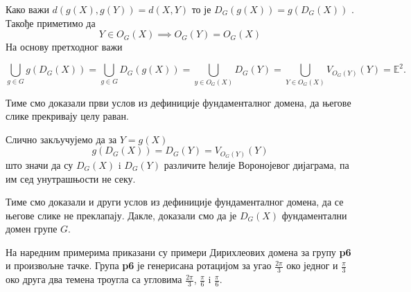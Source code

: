 \documentclass[12pt]{report}
\begin{document}
\noindent Како важи $d(g(X), g(Y))= d(X,Y)$ то је  $D_G(g(X)) = g(D_G(X))$  .
Такође приметимо да $$Y \in  O_G(X) \implies O_G(Y) = O_G(X) $$
На основу претходног важи

$$\bigcup_{g\in G}g(D_G(X)) = \bigcup_{g\in G}D_G(g(X)) = \bigcup_{y \in O_G(X)}D_G(Y)
= \bigcup_{Y \in O_G(X)}V_{O_G(Y)}(Y) = \mathbb{E}^2.$$

\noindent Тиме смо доказали први услов из дефиниције фундаменталног домена, да његове слике прекривају целу раван.

\noindent Слично закључујемо да за $Y = g(X)$
$$g(D_G(X)) = D_G(Y) = V_{O_G(Y)}(Y)$$ што значи да су $D_G(X)$ i $D_G(Y)$ различите ћелије Воронојевог дијаграма, па им сед унутрашњости не секу. 

Тиме смо доказали и други услов из дефиниције фундаменталног домена, да се његове слике не преклапају. Дакле, доказали смо да је $D_G(X)$ фундаментални домен групе $G$.

На наредним примерима приказани су примери Дирихлеових домена за групу \textbf{p6} и произвољне тачке. 
Група \textbf{p6} је генерисана ротацијом за угао \(\frac{2\pi}{3}\) око једног
и \(\frac{\pi}{3}\) око друга два темена троугла са угловима \(\frac{2\pi}{3}\), \(\frac{\pi}{6}\) i \(\frac{\pi}{6}\).
\end{document}
